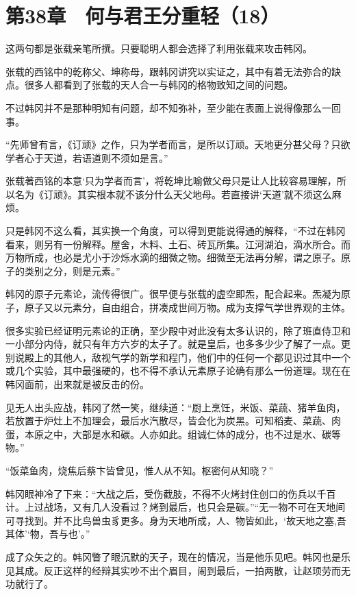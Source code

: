 \section{第38章　何与君王分重轻（18）}

这两句都是张载亲笔所撰。只要聪明人都会选择了利用张载来攻击韩冈。

张载的西铭中的乾称父、坤称母，跟韩冈讲究以实证之，其中有着无法弥合的缺点。很多人都看到了张载的天人合一与韩冈的格物致知之间的问题。

不过韩冈并不是那种明知有问题，却不知弥补，至少能在表面上说得像那么一回事。

“先师曾有言，《订顽》之作，只为学者而言，是所以订顽。天地更分甚父母？只欲学者心于天道，若语道则不须如是言。”

张载著西铭的本意‘只为学者而言’，将乾坤比喻做父母只是让人比较容易理解，所以名为《订顽》。其实根本就不该分什么天父地母。若直接讲‘天道’就不须这么麻烦。

只是韩冈不这么看，其实换一个角度，可以得到更能说得通的解释，“不过在韩冈看来，则另有一份解释。屋舍，木料、土石、砖瓦所集。江河湖泊，滴水所合。而万物所成，也必是尤小于沙烁水滴的细微之物。细微至无法再分解，谓之原子。原子的类别之分，则是元素。”

韩冈的原子元素论，流传得很广。很早便与张载的虚空即炁，配合起来。炁凝为原子，原子又以元素分，自由组合，拼凑成世间万物。成为支撑气学世界观的主体。

很多实验已经证明元素论的正确，至少殿中对此没有太多认识的，除了班直侍卫和一小部分内侍，就只有年方六岁的太子了。就是皇后，也多多少少了解了一点。更别说殿上的其他人，敌视气学的新学和程门，他们中的任何一个都见识过其中一个或几个实验，其中最强硬的，也不得不承认元素原子论确有那么一份道理。现在在韩冈面前，出来就是被反击的份。

见无人出头应战，韩冈了然一笑，继续道：“厨上烹饪，米饭、菜蔬、猪羊鱼肉，若放置于炉灶上不加理会，最后水汽散尽，皆会化为炭黑。可知稻麦、菜蔬、肉蛋，本原之中，大部是水和碳。人亦如此。组诚仁体的成分，也不过是水、碳等物。”

“饭菜鱼肉，烧焦后蔡卞皆曾见，惟人从不知。枢密何从知晓？”

韩冈眼神冷了下来：“大战之后，受伤截肢，不得不火烤封住创口的伤兵以千百计。上过战场，又有几人没看过？烤到最后，也只会是碳。”“无一物不可在天地间可寻找到。并不比鸟兽虫豸更多。身为天地所成，人、物皆如此，‘故天地之塞,吾其体’‘物，吾与也’。”

成了众矢之的。韩冈瞥了眼沉默的天子，现在的情况，当是他乐见吧。韩冈也是乐见其成。反正这样的经辩其实吵不出个眉目，闹到最后，一拍两散，让赵顼劳而无功就行了。

